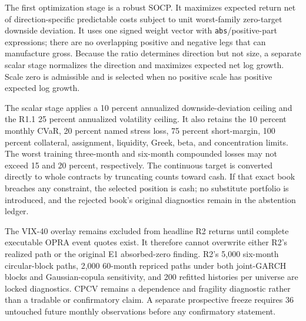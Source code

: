 The first optimization stage is a robust SOCP. It maximizes expected return net of
direction-specific predictable costs subject to unit worst-family zero-target downside
deviation. It uses one signed weight vector with \verb|abs|/positive-part expressions;
there are no overlapping positive and negative legs that can manufacture gross. Because
the ratio determines direction but not size, a separate scalar stage normalizes the
direction and maximizes expected net log growth. Scale zero is admissible and is selected
when no positive scale has positive expected log growth.

The scalar stage applies a 10 percent annualized downside-deviation ceiling and the R1.1
25 percent annualized volatility ceiling. It also retains the 10 percent monthly CVaR,
20 percent named stress loss, 75 percent short-margin, 100 percent collateral, assignment,
liquidity, Greek, beta, and concentration limits. The worst training three-month and
six-month compounded losses may not exceed 15 and 20 percent, respectively. The continuous
target is converted directly to whole contracts by truncating counts toward cash. If that
exact book breaches any constraint, the selected position is cash; no substitute portfolio
is introduced, and the rejected book's original diagnostics remain in the abstention
ledger.

\begin{table}[H]
\centering
\caption{R2 chronological retrospective development replay, February 2018--April 2026.
Sharpe is secondary; the promotion decision also uses path survival and the locked
simulation suites described in the text.}
\label{tab:r2_development}
\resizebox{\textwidth}{!}{}
\end{table}

The VIX-40 overlay remains excluded from headline R2 returns until complete executable
OPRA event quotes exist. It therefore cannot overwrite either R2's realized path or the
original E1 absorbed-zero finding. R2's 5,000 six-month circular-block paths, 2,000
60-month repriced paths under both joint-GARCH blocks and Gaussian-copula sensitivity, and
200 refitted histories per universe are locked diagnostics. CPCV remains a dependence and
fragility diagnostic rather than a tradable or confirmatory claim. A separate prospective
freeze requires 36 untouched future monthly observations before any confirmatory statement.
